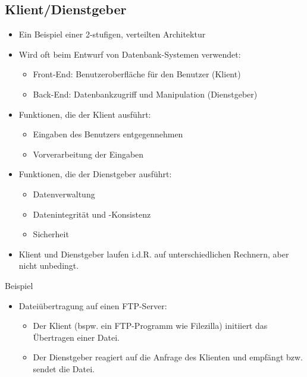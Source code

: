 \newpage

\subsection{Klient/Dienstgeber}

\begin{itemize}
    \item Ein Beispiel einer 2-stufigen, verteilten Architektur
    \item Wird oft beim Entwurf von Datenbank-Systemen verwendet:
    \begin{itemize}
        \item Front-End: Benutzeroberfläche für den Benutzer (Klient)
        \item Back-End: Datenbankzugriff und Manipulation (Dienstgeber)
    \end{itemize}
    \item Funktionen, die der Klient ausführt:
    \begin{itemize}
        \item Eingaben des Benutzers entgegennehmen
        \item Vorverarbeitung der Eingaben
    \end{itemize}
    \item Funktionen, die der Dienstgeber ausführt:
    \begin{itemize}
        \item Datenverwaltung
        \item Datenintegrität und -Konsistenz
        \item Sicherheit
    \end{itemize}
    \item Klient und Dienstgeber laufen i.d.R. auf unterschiedlichen Rechnern, aber nicht unbedingt.
\end{itemize}

Beispiel

\begin{itemize}
    \item Dateiübertragung auf einen FTP-Server:
    \begin{itemize}
        \item Der Klient (bspw. ein FTP-Programm wie Filezilla) initiiert das Übertragen einer Datei.
        \item Der Dienstgeber reagiert auf die Anfrage des Klienten und empfängt bzw. sendet die Datei.
    \end{itemize}
\end{itemize}

